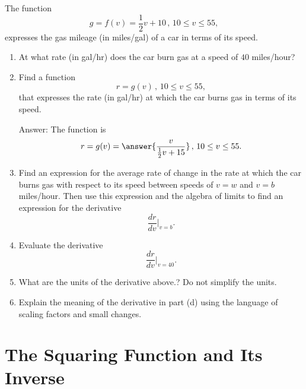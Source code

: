 \documentclass{ximera}
\begin{document}
\begin{question} \label{QOidIdtgt4n}
The function
\[
   g = f(v) = \frac{1}{2}v + 10 \, , \, 10\leq v \leq 55 ,
\]
expresses the gas mileage (in miles/gal) of a car in terms of its speed.

\begin{enumerate}
\item At what rate (in gal/hr) does the car burn gas at a speed of $40$ miles/hour?

\item Find a function
\[
    r =g(v)\, , \, 10\leq v \leq 55 ,
\]
that expresses the rate (in gal/hr) at which the car burns gas in terms of its speed.

Answer: The function is 
\[
     r = g(v) = \answer{\frac{v}{\frac{1}{2}v + 15}} \, , \, 10\leq v \leq 55 .
\]

\item Find an expression for the average rate of change in the rate at which the car burns gas with respect to its speed between speeds of $v=w$ and $v=b$ miles/hour. Then use this expression and the algebra of limits to find an expression for the derivative
\[
   \frac{dr}{dv}\Big|_{v=b} .
\]

\item Evaluate the derivative
\[
   \frac{dr}{dv}\Big|_{v=40} .
\]

\item What are the units of the derivative above.? Do not simplify the units.

\item Explain the meaning of the derivative in part (d) using the language of scaling factors and small changes.


\end{enumerate}
\end{question}

\section{The Squaring Function and Its Inverse}
\end{document}

